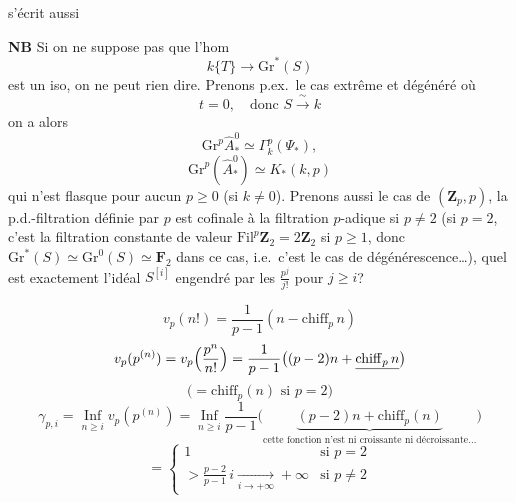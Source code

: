 \documentclass[11pt,a4paper]{article}
\begin{document}
 s'écrit aussi



\textbf{NB} Si on ne suppose pas que l'hom
\[ k\{T\} \to \mathrm{Gr}^*(S) \]
est un iso, on ne peut rien dire.
Prenons p.ex.\ le cas extrême et dégénéré où
\[ t = 0, \quad \text{donc } S \xrightarrow{\ \sim\ } k \]
on a alors
\[ \mathrm{Gr}^p\widehat{A}^0_* \simeq \Gamma^p_k(\Psi_*), \]
\[ \mathrm{Gr}^p(\widehat{A}^0_*) \simeq K_*(k, p) \]
qui n'est flasque pour aucun $p \geq 0$ (si $k \neq 0$).
Prenons aussi le cas de $(\mathbf{Z}_p, p)$, la
p.d.-filtration définie par $p$ est cofinale à la
filtration $p$-adique si $p \neq 2$ (si $p = 2$,
c'est la filtration constante de valeur
$\mathrm{Fil}^p\mathbf{Z}_2 = 2\mathbf{Z}_2$ si $p \geq 1$, donc $\mathrm{Gr}^*(S) \simeq \mathrm{Gr}^0(S) \simeq \mathbf{F}_2$
dans ce cas, i.e.\ c'est le cas de
dégénérescence…), quel est exactement l'idéal
$S^{[i]}$ engendré par les
$\frac{p^j}{j!}$ pour $j \geq i$? 

\[ v_p(n!) = \frac{1}{p-1}(n - \mathrm{chiff}_p\,n) \]
\[ v_p(p^{(n)}) = v_p\Bigl(\frac{p^n}{n!}\Bigr) = \frac{1}{p-1}\bigl((p-2)n + \underline{\mathrm{chiff}_p\,n}\bigr) \]
\[ \bigl(= \mathrm{chiff}_p(n) \text{ si } p = 2\bigr) \]
\[ \gamma_{p,i} = \operatorname*{Inf}_{n \geq i} v_p(p^{(n)}) = \operatorname*{Inf}_{n \geq i} \frac{1}{p-1}\bigl(\underbrace{(p-2)n + \mathrm{chiff}_p(n)}_{\text{cette fonction n'est ni croissante ni décroissante…}}\bigr) \]
\[ = \begin{cases} 1 & \text{si } p = 2 \\ > \frac{p-2}{p-1}\,i \xrightarrow[i \to +\infty]{} +\infty & \text{si } p \neq 2 \end{cases} \]
\end{document}

